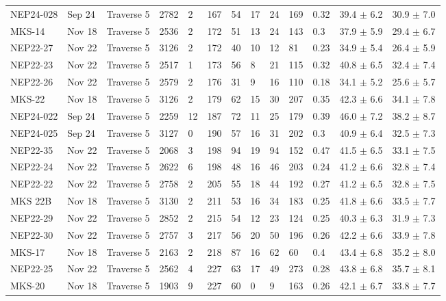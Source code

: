 \begin{landscape}
{\begin{longtable}{l l l l l l l l l l l l l}
    NEP24-028 & Sep 24 & Traverse 5 & 2782 & 2 & 167 & 54 & 17 & 24 & 169 & 0.32 & 39.4 $\pm$ 6.2 & 30.9 $\pm$ 7.0 \\
    MKS-14 & Nov 18 & Traverse 5 & 2536 & 2 & 172 & 51 & 13 & 24 & 143 & 0.3 & 37.9 $\pm$ 5.9 & 29.4 $\pm$ 6.7 \\
    NEP22-27 & Nov 22 & Traverse 5 & 3126 & 2 & 172 & 40 & 10 & 12 & 81 & 0.23 & 34.9 $\pm$ 5.4 & 26.4 $\pm$ 5.9 \\
    NEP22-23 & Nov 22 & Traverse 5 & 2517 & 1 & 173 & 56 & 8 & 21 & 115 & 0.32 & 40.8 $\pm$ 6.5 & 32.4 $\pm$ 7.4 \\
    NEP22-26 & Nov 22 & Traverse 5 & 2579 & 2 & 176 & 31 & 9 & 16 & 110 & 0.18 & 34.1 $\pm$ 5.2 & 25.6 $\pm$ 5.7 \\
    MKS-22 & Nov 18 & Traverse 5 & 3126 & 2 & 179 & 62 & 15 & 30 & 207 & 0.35 & 42.3 $\pm$ 6.6 & 34.1 $\pm$ 7.8 \\
    NEP24-022 & Sep 24 & Traverse 5 & 2259 & 12 & 187 & 72 & 11 & 25 & 179 & 0.39 & 46.0 $\pm$ 7.2 & 38.2 $\pm$ 8.7 \\
    NEP24-025 & Sep 24 & Traverse 5 & 3127 & 0 & 190 & 57 & 16 & 31 & 202 & 0.3 & 40.9 $\pm$ 6.4 & 32.5 $\pm$ 7.3 \\
    NEP22-35 & Nov 22 & Traverse 5 & 2068 & 3 & 198 & 94 & 19 & 94 & 152 & 0.47 & 41.5 $\pm$ 6.5 & 33.1 $\pm$ 7.5 \\
    NEP22-24 & Nov 22 & Traverse 5 & 2622 & 6 & 198 & 48 & 16 & 46 & 203 & 0.24 & 41.2 $\pm$ 6.6 & 32.8 $\pm$ 7.4 \\
    NEP22-22 & Nov 22 & Traverse 5 & 2758 & 2 & 205 & 55 & 18 & 44 & 192 & 0.27 & 41.2 $\pm$ 6.5 & 32.8 $\pm$ 7.5 \\
    MKS 22B & Nov 18 & Traverse 5 & 3130 & 2 & 211 & 53 & 16 & 34 & 183 & 0.25 & 41.8 $\pm$ 6.6 & 33.5 $\pm$ 7.7 \\
    NEP22-29 & Nov 22 & Traverse 5 & 2852 & 2 & 215 & 54 & 12 & 23 & 124 & 0.25 & 40.3 $\pm$ 6.3 & 31.9 $\pm$ 7.3 \\
    NEP22-30 & Nov 22 & Traverse 5 & 2757 & 3 & 217 & 56 & 20 & 50 & 196 & 0.26 & 42.2 $\pm$ 6.6 & 33.9 $\pm$ 7.8 \\
    MKS-17 & Nov 18 & Traverse 5 & 2163 & 2 & 218 & 87 & 16 & 62 & 60 & 0.4 & 43.4 $\pm$ 6.8 & 35.2 $\pm$ 8.0 \\
    NEP22-25 & Nov 22 & Traverse 5 & 2562 & 4 & 227 & 63 & 17 & 49 & 273 & 0.28 & 43.8 $\pm$ 6.8 & 35.7 $\pm$ 8.1 \\
    MKS-20 & Nov 18 & Traverse 5 & 1903 & 9 & 227 & 60 & 0 & 9 & 163 & 0.26 & 42.1 $\pm$ 6.7 & 33.8 $\pm$ 7.7 \\

\end{longtable}}
\end{landscape}
